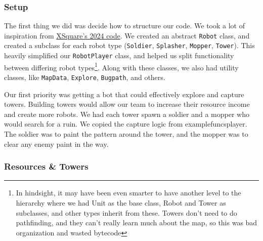 \subsubsection{Setup}

  The first thing we did was decide how to structure our code. We took a lot of inspiration from \href{https://github.com/IvanGeffner/BTC24}{XSquare's 2024 code}. We created an abstract \verb|Robot| class, and created a subclass for each robot type (\verb|Soldier|, \verb|Splasher|, \verb|Mopper|, \verb|Tower|). This heavily simplified our \verb|RobotPlayer| class, and helped us split functionality between differing robot types\footnote{In hindsight, it may have been even smarter to have another level to the hierarchy where we had Unit as the base class, Robot and Tower as subclasses, and other types inherit from these. Towers don't need to do pathfinding, and they can't really learn much about the map, so this was bad organization and wasted bytecode}. Along with these classes, we also had utility classes, like \verb|MapData|, \verb|Explore|, \verb|Bugpath|, and others.

  \medskip

  Our first priority was getting a bot that could effectively explore and capture towers. Building towers would allow our team to increase their resource income and create more robots. We had each tower spawn a soldier and a mopper who would search for a ruin. We copied the capture logic from examplefuncsplayer. The soldier was to paint the pattern around the tower, and the mopper was to clear any enemy paint in the way.

  \subsubsection{Resources \& Towers}

